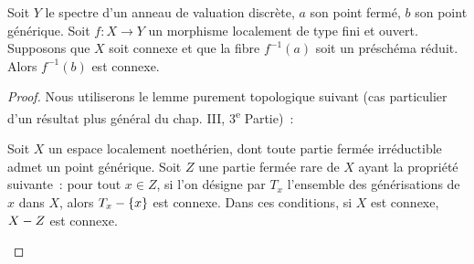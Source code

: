 \begin{lemma}[15.5.6]
\label{IV.15.5.6-fr}
Soit $Y$ le spectre d'un anneau de valuation discrète, $a$ son point fermé, $b$ son point générique. Soit $f:X\to Y$ un morphisme localement de type fini et ouvert. Supposons que $X$ soit connexe et que la fibre $f^{-1}(a)$ soit un préschéma réduit. Alors $f^{-1}(b)$ est connexe.
\end{lemma}

\begin{proof}
Nous utiliserons le lemme purement topologique suivant (cas particulier d'un résultat plus général du chap. III, 3\textsuperscript{e} Partie)~:
\begin{lemma}[15.5.6.1]
\label{IV.15.5.6.1-fr}
Soit $X$ un espace localement noethérien, dont toute partie fermée irréductible admet un point générique. Soit $Z$ une partie fermée rare de $X$ ayant la propriété suivante~: pour tout $x\in Z$, si l'on désigne par $T_x$ l'ensemble des générisations de $x$ dans $X$, alors $T_x-\{x\}$ est connexe. Dans ces conditions, si $X$ est connexe, $X- Z$ est connexe.
\end{lemma}


\end{proof}
